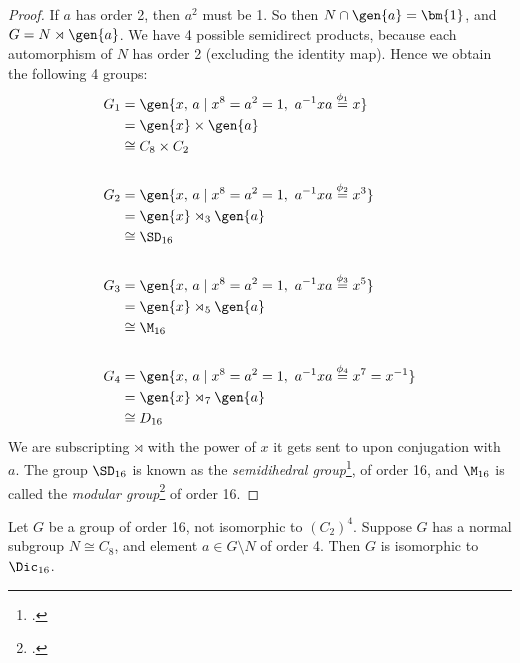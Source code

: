 \begin{proof}
    If \(a\) has order 2, then \(a^2\) must be 1.
    So then \(N \cap \gen{a} = \bm{1}\), and \(G = N \rtimes \gen{a}\).
    We have 4 possible semidirect products, because each automorphism of \(N\) has order 2 (excluding the
    identity map).
    Hence we obtain the following 4 groups:
    \begin{equation*}
    \begin{aligned}
        G_1 &= \gen{x,\,a \mid x^8 = a^2 = 1,\ a^{-1}xa \overset{\phi_1}{=} x} \\
            &= \gen{x} \times \gen{a} \\
            &\cong C_8 \times C_2 \\
            & \\
        G_2 &= \gen{x,\,a \mid x^8 = a^2 = 1,\ a^{-1}xa \overset{\phi_2}{=} x^{3}} \\
            &= \gen{x} \rtimes_3 \gen{a} \\
            &\cong \SD_{16}\\
            & \\
        G_3 &= \gen{x,\,a \mid x^8 = a^2 = 1,\ a^{-1}xa \overset{\phi_3}{=} x^{5}} \\
            &= \gen{x} \rtimes_5 \gen{a} \\
            &\cong \M_{16}\\
            & \\
        G_4 &= \gen{x,\,a \mid x^8 = a^2 = 1,\ a^{-1}xa \overset{\phi_4}{=} x^7 = x^{-1}} \\
            &= \gen{x} \rtimes_7 \gen{a} \\
            &\cong D_{16}
    \end{aligned}
    \end{equation*}
    We are subscripting \(\rtimes\) with the power of \(x\) it gets sent to upon conjugation with \(a\).
    The group \(\SD_{16}\) is known as the \emph{semidihedral group}\footcite{semidihedral}, of order 16, and
    \(\M_{16}\) is called the \emph{modular group}\footcite{order16names} of order 16.
\end{proof}

\begin{lemma}
    Let \(G\) be a group of order 16, not isomorphic to \({(C_{2})}^4\).
    Suppose \(G\) has a normal subgroup \(N \cong C_8\), and element \(a \in G\setminus N\) of order 4.
    Then \(G\) is isomorphic to \(\Dic_{16}\).
\end{lemma}


